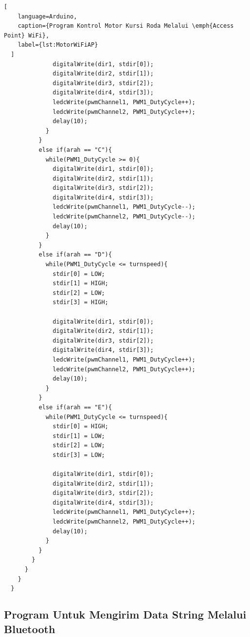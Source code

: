 \begin{lstlisting}[
    language=Arduino,
    caption={Program Kontrol Motor Kursi Roda Melalui \emph{Access Point} WiFi},
    label={lst:MotorWiFiAP}
  ]
              digitalWrite(dir1, stdir[0]);
              digitalWrite(dir2, stdir[1]);
              digitalWrite(dir3, stdir[2]);
              digitalWrite(dir4, stdir[3]);
              ledcWrite(pwmChannel1, PWM1_DutyCycle++);
              ledcWrite(pwmChannel2, PWM1_DutyCycle++);
              delay(10);
            }
          }
          else if(arah == "C"){
            while(PWM1_DutyCycle >= 0){
              digitalWrite(dir1, stdir[0]);
              digitalWrite(dir2, stdir[1]);
              digitalWrite(dir3, stdir[2]);
              digitalWrite(dir4, stdir[3]);
              ledcWrite(pwmChannel1, PWM1_DutyCycle--);
              ledcWrite(pwmChannel2, PWM1_DutyCycle--);
              delay(10);
            }
          }
          else if(arah == "D"){
            while(PWM1_DutyCycle <= turnspeed){
              stdir[0] = LOW;
              stdir[1] = HIGH;
              stdir[2] = LOW;
              stdir[3] = HIGH;
  
              digitalWrite(dir1, stdir[0]);
              digitalWrite(dir2, stdir[1]);
              digitalWrite(dir3, stdir[2]);
              digitalWrite(dir4, stdir[3]);
              ledcWrite(pwmChannel1, PWM1_DutyCycle++);
              ledcWrite(pwmChannel2, PWM1_DutyCycle++);
              delay(10);
            }
          }
          else if(arah == "E"){
            while(PWM1_DutyCycle <= turnspeed){
              stdir[0] = HIGH;
              stdir[1] = LOW;
              stdir[2] = LOW;
              stdir[3] = LOW;
  
              digitalWrite(dir1, stdir[0]);
              digitalWrite(dir2, stdir[1]);
              digitalWrite(dir3, stdir[2]);
              digitalWrite(dir4, stdir[3]);
              ledcWrite(pwmChannel1, PWM1_DutyCycle++);
              ledcWrite(pwmChannel2, PWM1_DutyCycle++);
              delay(10);
            }
          }
        }
      }
    }
  }  
  \end{lstlisting}

\subsection*{Program Untuk Mengirim Data String Melalui Bluetooth}

